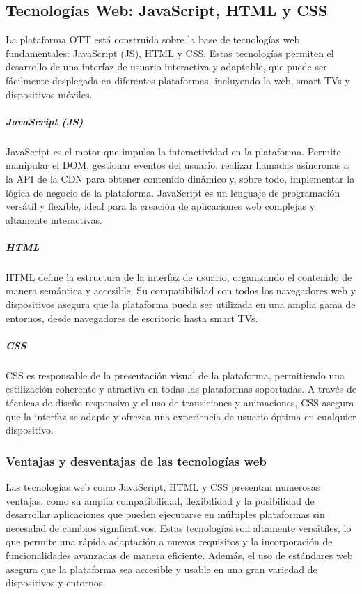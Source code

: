 \subsection{Tecnologías Web: JavaScript, HTML y CSS}
\label{sec:TechWeb}

La plataforma OTT está construida sobre la base de tecnologías web fundamentales: JavaScript (JS), 
HTML y CSS. Estas tecnologías permiten el desarrollo de una interfaz de usuario interactiva y
 adaptable, que puede ser fácilmente desplegada en diferentes plataformas, incluyendo la web, 
 smart TVs y dispositivos móviles.

\subparagraph{JavaScript (JS)}
JavaScript es el motor que impulsa la interactividad en la plataforma. Permite manipular el DOM, 
gestionar eventos del usuario, realizar llamadas asíncronas a la API de la CDN para obtener contenido 
dinámico y, sobre todo, implementar la lógica de negocio de la plataforma. JavaScript es un lenguaje de 
programación versátil y flexible, ideal para la creación de aplicaciones web complejas y altamente interactivas.

\subparagraph{HTML}
HTML define la estructura de la interfaz de usuario, organizando el contenido de manera semántica y 
accesible. Su compatibilidad con todos los navegadores web y dispositivos asegura que la plataforma 
pueda ser utilizada en una amplia gama de entornos, desde navegadores de escritorio hasta smart TVs.

\subparagraph{CSS}
CSS es responsable de la presentación visual de la plataforma, permitiendo una estilización coherente 
y atractiva en todas las plataformas soportadas. A través de técnicas de diseño responsivo y el uso 
de transiciones y animaciones, CSS asegura que la interfaz se adapte y ofrezca una experiencia de 
usuario óptima en cualquier dispositivo.

\subsubsection{Ventajas y desventajas de las tecnologías web}
\label{subsec:TechWeb_ventajas_desventajas}

Las tecnologías web como JavaScript, HTML y CSS presentan numerosas ventajas, como su amplia compatibilidad, 
flexibilidad y la posibilidad de desarrollar aplicaciones que pueden ejecutarse en múltiples plataformas sin 
necesidad de cambios significativos. Estas tecnologías son altamente versátiles, lo que permite una rápida 
adaptación a nuevos requisitos y la incorporación de funcionalidades avanzadas de manera eficiente. Además, 
el uso de estándares web asegura que la plataforma sea accesible y usable en una gran variedad de dispositivos y entornos.

